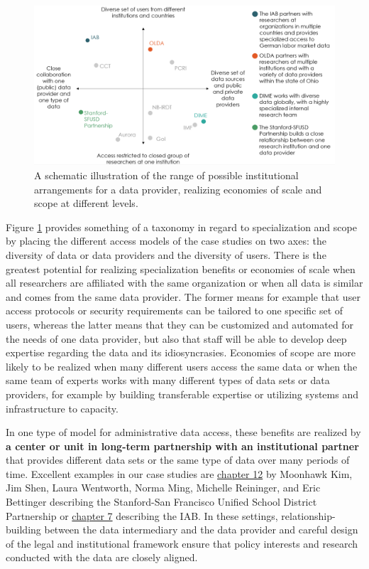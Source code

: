 \begin{figure}
\centering
\includegraphics{./figures/introfigure1.png}
\caption{\label{fig:introfig1}A schematic illustration of the range of possible institutional arrangements for a data provider, realizing economies of scale and scope at different levels.}
\end{figure}

Figure \ref{fig:introfig1} provides something of a taxonomy in regard to specialization and scope by placing the different access models of the case studies on two axes: the diversity of data or data providers and the diversity of users. There is the greatest potential for realizing specialization benefits or economies of scale when all researchers are affiliated with the same organization or when all data is similar and comes from the same data provider. The former means for example that user access protocols or security requirements can be tailored to one specific set of users, whereas the latter means that they can be customized and automated for the needs of one data provider, but also that staff will be able to develop deep expertise regarding the data and its idiosyncrasies. Economies of scope are more likely to be realized when many different users access the same data or when the same team of experts works with many different types of data sets or data providers, for example by building transferable expertise or utilizing systems and infrastructure to capacity.

In one type of model for administrative data access, these benefits are realized by \textbf{a center or unit in long-term partnership with an institutional partner} that provides different data sets or the same type of data over many periods of time. Excellent examples in our case studies are \protect\hyperlink{sfusd}{chapter 12} by Moonhawk Kim, Jim Shen, Laura Wentworth, Norma Ming, Michelle Reininger, and Eric Bettinger describing the Stanford-San Francisco Unified School District Partnership or \protect\hyperlink{iab}{chapter 7} describing the IAB. In these settings, relationship-building between the data intermediary and the data provider and careful design of the legal and institutional framework ensure that policy interests and research conducted with the data are closely aligned.

